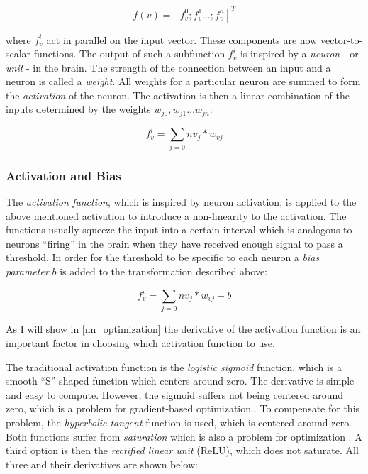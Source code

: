 $$ f(v) =  [f_{v}^{0};f_{v}^{1}\ldots;f_{v}^{n}]^T $$ 

where $f_v^{i}$ act in parallel on the input vector. These components are now vector-to-scalar functions. The output of such a subfunction $f_{v}^{i}$ is inspired by a \emph{neuron} - or \emph{unit} - in the brain. The strength of the connection between an input and a neuron is called a \emph{weight}. All weights for a particular neuron are summed to form the \emph{activation} of the neuron. The activation is then a linear combination of the inputs determined by the weights $w_{j0}, w_{j1} \ldots w_{jn}$:

$$
    f_{v}^{i} =  \sum_{j=0}{n} v_j * w_{vj} 
$$

\subsubsection{Activation and Bias}
The \emph{activation function}, which is inspired by neuron activation, is applied to the above mentioned activation to introduce a non-linearity to the activation. The functions usually squeeze the input into a certain interval which is analogous to neurons ``firing'' in the brain when they have received enough signal to pass a threshold. In order for the threshold to be specific to each neuron a \emph{bias parameter} $b$ is added to the transformation described above:

$$
    f_{v}^{i} =  \sum_{j=0}{n} v_j * w_{vj} + b 
$$


As I will show in \autoref{nn_optimization} the derivative of the activation function is an important factor in choosing which activation function to use.

The traditional activation function is the \emph{logistic sigmoid} function, which is a smooth ``S''-shaped function which centers around zero. The derivative is simple and easy to compute. However, the sigmoid suffers not being centered around zero, which is a problem for gradient-based optimization.\citep[p. 66]{dlbook}. To compensate for this problem, the \emph{hyperbolic tangent} function is used, which is centered around zero. Both functions suffer from \emph{saturation} which is also a problem for optimization \cite{activations}. A third option is then the \emph{rectified linear unit} (ReLU), which does not saturate. All three and their derivatives are shown below:

\begin{center}
\end{center}

